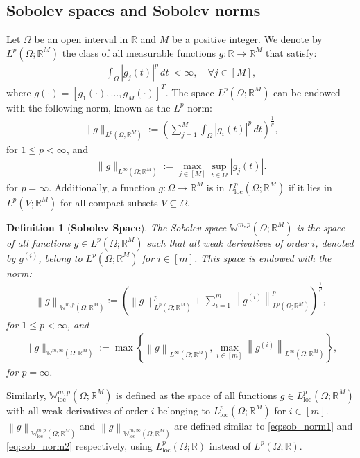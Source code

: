 \documentclass{article}
\newtheorem{definition}{Definition}
\newcommand{\norm}[1]{\left\lVert#1\right\rVert}
\newcommand{\lp}[1]{{L}^{#1}\left(\Omega; \mathbb{R}\right)}
\newcommand{\lpm}[1]{{L}^{#1}\left(\Omega; \mathbb{R}^M\right)}
\newcommand{\lploc}[1]{{L}_{\textrm{loc}}^{#1}\left(\Omega; \mathbb{R}\right)}
\newcommand{\lpmloc}[1]{{L}_{\textrm{loc}}^{#1}\left(\Omega; \mathbb{R}^M\right)}
\newcommand{\smp}{\mathbb{W}^{m,p}\left(\Omega; \mathbb{R}^M\right)}
\newcommand{\smploc}{\mathbb{W}_{\textrm{loc}}^{m,p}\left(\Omega; \mathbb{R}^M\right)}
\newcommand{\soblocm}[2]{\mathbb{W}_{\textrm{loc}}^{#1,#2}\left(\Omega; \mathbb{R}^M\right)}
\newcommand{\sobm}[2]{\mathbb{W}^{#1,#2}\left(\Omega; \mathbb{R}^M\right)}
\begin{document}
\subsection{Sobolev spaces and Sobolev norms}\label{app:sobolev}
Let $\Omega$ be an open interval in $\mathbb{R}$ and $M$ be a positive integer. We denote by $\lpm{p}$ the class of all measurable functions $g:\mathbb{R} \to \mathbb{R}^M$ that satisfy:
\begin{align}
\int_{\Omega}|g_j(t)|^p \,dt\ < \infty, \quad \forall j\in [M],
\end{align}
where $g(\cdot) = [g_1(\cdot),\dots,g_M(\cdot)]^T$. The space $\lpm{p}$ can be endowed with the following norm, known as the ${L}^p$ norm:
\begin{align}
    \|g\|_{\lpm{p}} := \left(\sum^M_{j=1}\int_{\Omega}|g_i(t)|^p \,dt\right)^{\frac{1}{p}},
\end{align}
for $1 \leqslant p < \infty$, and
\begin{align}
    \|g\|_{\lpm{\infty}} := \max_{j \in [M]} \sup_{t\in \Omega} |g_j(t)|.
\end{align}
for $p=\infty$. Additionally, a function $g: \Omega \to \mathbb{R}^M$ is in $\lpmloc{p}$ if it lies in ${L}^p(V;\mathbb{R}^M)$ for all compact subsets $V \subseteq \Omega$. 
\begin{definition}[\textbf{Sobolev Space}] 
The \emph{Sobolev space} $\smp$ is the space of all functions $g \in \lpm{p}$ such that all weak derivatives of order $i$, denoted by $g^{(i)}$, belong to $\lpm{p}$ for $i \in [m]$. This space is endowed with the norm:
\begin{align}\label{eq:sob_norm1}
    \norm{g}_{\smp} :=  \left(\norm{g}_{\lpm{p}}^p  + \sum^m_{i=1} \norm{g^{(i)}}_{\lpm{p}}^p \right)^\frac{1}{p},
\end{align}
for $1 \leqslant p < \infty$, and
\begin{align}\label{eq:sob_norm2}
    \|g\|_{\sobm{m}{\infty}} := \max \left \{ \norm{g}_{\lpm{\infty}},  \max_{i\in [m]} \norm{g^{(i)}}_{\lpm{\infty}}\right \},
\end{align}
for $p=\infty$.
\end{definition}
Similarly, $\smploc$ is defined as the space of all functions $g \in \lpmloc{p}$ with all weak derivatives of order $i$ belonging to $\lpmloc{p}$ for $i \in [m]$. $\norm{g}_{\smploc}$ and $\norm{g}_{\soblocm{m}{\infty}}$ are defined similar to \eqref{eq:sob_norm1} and \eqref{eq:sob_norm2} respectively, using $\lploc{p}$ instead of $\lp{p}$. 
\end{document}
